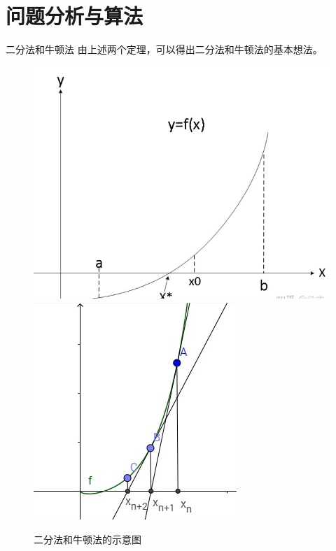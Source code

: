 \documentclass{beamer}
\begin{document}
\section{问题分析与算法}
\begin{frame}{二分法和牛顿法}
    由上述两个定理，可以得出二分法和牛顿法的基本想法。\cite{nb_zhihu}
    \begin{figure}[H]
        \centering
        \includegraphics[scale=0.20]{./pic/1.png}
        \includegraphics[scale=0.3]{./pic/2.png}
        
        \caption{二分法和牛顿法的示意图}
      \end{figure}
\end{frame}
\end{document}
